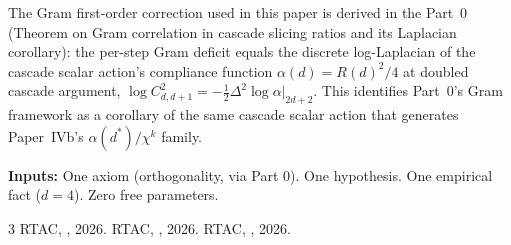 \documentclass[11pt,a4paper]{article}
\begin{document}
\noindent The Gram first-order correction used in this paper is derived
in the Part~0 (Theorem on Gram correlation in cascade
slicing ratios and its Laplacian corollary): the per-step Gram deficit
equals the discrete log-Laplacian of the cascade scalar action's
compliance function $\alpha(d) = R(d)^2/4$ at doubled cascade argument,
$\log C^2_{d,d+1} = -\tfrac{1}{2}\Delta^2\log\alpha\big|_{2d+2}$. This
identifies Part~0's Gram framework as a corollary of the same
cascade scalar action that generates Paper~IVb's $\alpha(d^*)/\chi^k$
family.

\textbf{Inputs:} One axiom (orthogonality, via Part 0). One hypothesis.
One empirical fact ($d = 4$). Zero free parameters.

\begin{thebibliography}{3}
 RTAC, , 2026.
 RTAC, , 2026.
 RTAC, , 2026.
\end{thebibliography}
\end{document}
